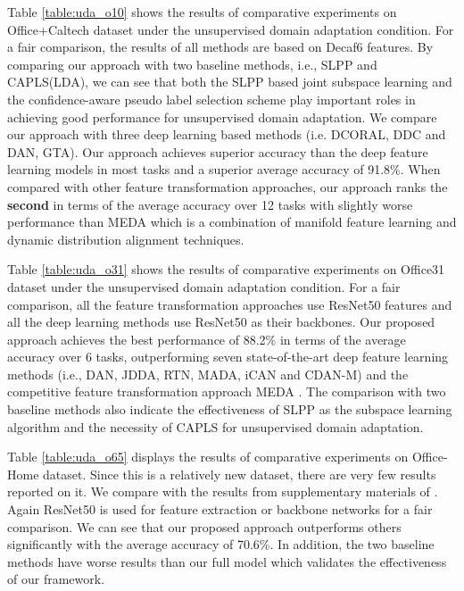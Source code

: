 \documentclass[conference]{IEEEtran}
\begin{document}
Table \ref{table:uda_o10} shows the results of comparative experiments on Office+Caltech dataset under the unsupervised domain adaptation condition. For a fair comparison, the results of all methods are based on Decaf6 features. By comparing our approach with two baseline methods, i.e., SLPP and CAPLS(LDA), we can see that both the SLPP based joint subspace learning and the confidence-aware pseudo label selection scheme play important roles in achieving good performance for unsupervised domain adaptation. We compare our approach with three deep learning based methods (i.e. DCORAL\cite{sun2016deep}, DDC\cite{tzeng2014deep} and DAN\cite{long2015learning}, GTA\cite{sankaranarayanan2017generate}). Our approach achieves superior accuracy than the deep feature learning models in most tasks and a superior average accuracy of 91.8\%. When compared with other feature transformation approaches, our approach ranks the \textbf{second} in terms of the average accuracy over 12 tasks with slightly worse performance than MEDA \cite{wang2018visual} which is a combination of manifold feature learning and dynamic distribution alignment techniques.

Table \ref{table:uda_o31} shows the results of comparative experiments on Office31 dataset under the unsupervised domain adaptation condition. For a fair comparison, all the feature transformation approaches use ResNet50 features and all the deep learning methods use ResNet50 as their backbones. Our proposed approach achieves the best performance of 88.2\% in terms of the average accuracy over 6 tasks, outperforming seven state-of-the-art deep feature learning methods (i.e., DAN\cite{sun2016deep}, JDDA\cite{chen2018joint}, RTN\cite{long2016unsupervised}, MADA\cite{pei2018multi}, iCAN\cite{zhang2018collaborative} and CDAN-M\cite{long2018conditional}) and the competitive feature transformation approach MEDA \cite{wang2018visual}. The comparison with two baseline methods also indicate the effectiveness of SLPP as the subspace learning algorithm and the necessity of CAPLS for unsupervised domain adaptation.

Table \ref{table:uda_o65} displays the results of comparative experiments on Office-Home dataset. Since this is a relatively new dataset, there are very few results reported on it. We compare with the results from supplementary materials of \cite{wang2018visual}. Again ResNet50 is used for feature extraction or backbone networks for a fair comparison. We can see that our proposed approach outperforms others significantly with the average accuracy of 70.6\%. In addition, the two baseline methods have worse results than our full model which validates the effectiveness of our framework.
\end{document}
